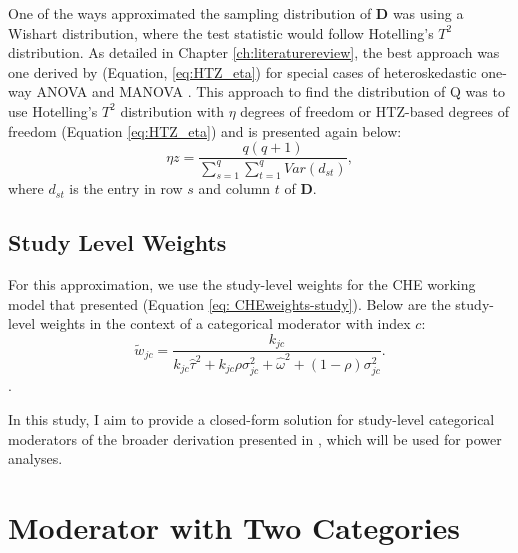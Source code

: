 One of the ways \textcite{tipton2015b} approximated the sampling distribution of $\mathbf{D}$ was using a Wishart distribution, where the test statistic would follow Hotelling's $T^2$ distribution. As detailed in Chapter \ref{ch:literaturereview}, the best approach was one derived by \textcite{zhang2012, zhang2013}(Equation, \ref{eq:HTZ_eta}) for special cases of heteroskedastic one-way ANOVA and MANOVA \autocite{tipton2015b}. This approach to find the distribution of Q was to use Hotelling's $T^2$ distribution with $\eta$ degrees of freedom or HTZ-based degrees of freedom (Equation \ref{eq:HTZ_eta}) and is presented again below:
\begin{equation}
    \eta z = \frac{q(q+1)}{\sum_{s=1}^q \sum_{t=1}^q Var(d_{st})},
    \nonumber
\end{equation}
where $d_{st}$ is the entry in row $s$ and column $t$ of $\bm{D}$.

\subsection{Study Level Weights}

For this approximation, we use the study-level weights for the CHE working model that \textcite{vembye2023} presented (Equation \ref{eq: CHEweights-study}). Below are the study-level weights in the context of a categorical moderator with index $c$: 
\begin{equation} \label{eq: CHEweights-study_cat}
    \tilde{w}_{jc} = \frac{k_{jc}}{k_{jc}\hat{\tau}^2 + k_{jc}\rho\sigma_{jc}^2 +\hat{\omega}^2 + (1- \rho)\sigma_{jc}^2}.
\end{equation}.

In this study, I aim to provide a closed-form solution for study-level categorical moderators of the broader derivation presented in \textcite{tipton2015b}, which will be used for power analyses.  


 \section{Moderator with Two Categories}

